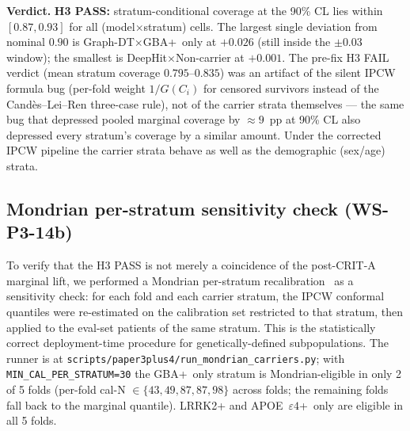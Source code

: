 \documentclass[11pt]{article}
\begin{document}
\noindent\textbf{Verdict.} \textbf{H3 PASS:} stratum-conditional coverage at the 90\% CL lies within $[0.87, 0.93]$ for all (model$\times$stratum) cells. The largest single deviation from nominal $0.90$ is Graph-DT$\times$GBA+~only at $+0.026$ (still inside the $\pm 0.03$ window); the smallest is DeepHit$\times$Non-carrier at $+0.001$. The pre-fix H3 FAIL verdict (mean stratum coverage $0.795$--$0.835$) was an artifact of the silent IPCW formula bug (per-fold weight $1/G(C_i)$ for censored survivors instead of the Cand\`es--Lei--Ren three-case rule), not of the carrier strata themselves --- the same bug that depressed pooled marginal coverage by $\approx 9$~pp at 90\% CL also depressed every stratum's coverage by a similar amount. Under the corrected IPCW pipeline the carrier strata behave as well as the demographic (sex/age) strata.

\subsection*{Mondrian per-stratum sensitivity check (WS-P3-14b)}

To verify that the H3 PASS is not merely a coincidence of the post-CRIT-A marginal lift, we performed a Mondrian per-stratum recalibration~\cite{bostrom2025mondrian,vovk2022conformal} as a sensitivity check: for each fold and each carrier stratum, the IPCW conformal quantiles were re-estimated on the calibration set restricted to that stratum, then applied to the eval-set patients of the same stratum. This is the statistically correct deployment-time procedure for genetically-defined subpopulations. The runner is at \texttt{scripts/paper3plus4/run\_mondrian\_carriers.py}; with \texttt{MIN\_CAL\_PER\_STRATUM=30} the GBA+~only stratum is Mondrian-eligible in only 2 of 5 folds (per-fold cal-N $\in \{43, 49, 87, 87, 98\}$ across folds; the remaining folds fall back to the marginal quantile). LRRK2+ and APOE~$\varepsilon4$+~only are eligible in all 5 folds.
\end{document}
